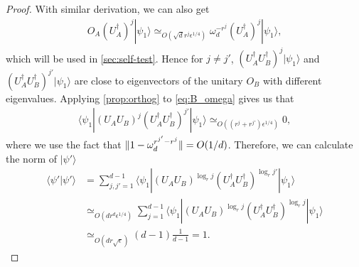 \documentclass[11pt,letterpaper]{article}
\newcommand{\ket}[1]{|#1\rangle}
\newcommand{\bra}[1]{\langle#1|}
\newcommand{\braket}[2]{\langle#1|#2\rangle}
\newcommand{\ct}{^{\dagger}}
\DeclarePairedDelimiter{\norm}{\lVert}{\rVert}
\newcommand{\1}{\mathbb{1}}
\newcommand{\nr}{n(r)}
\newcommand{\se}{\sqrt{\epsilon}}
\newcommand{\qe}{\epsilon^{1/4}}
\newcommand{\sd}{\sqrt{d}}
\newcommand{\sr}{\sqrt{r}}
\newcommand{\appd}[1]{\simeq_{#1}}
\theoremstyle{definition}
\begin{document}
\begin{proof}
    With similar derivation, we can also get
    \begin{align}
    \label{eq:A_omega}
        O_A (U_A\ct)^j \ket{\psi_1} \appd{O(\sd r^{j} \qe)}\omega_d^{-r^j}  (U_A\ct)^j \ket{\psi_1},
    \end{align}
    which will be used in \cref{sec:self-test}.
	Hence for $j \neq j'$, $(U_A\ct U_B\ct)^{j} \ket{\psi_1}$ and $(U_A\ct U_B\ct)^{ j'} \ket{\psi_1}$ are close to eigenvectors
	of the unitary $O_B$ with different eigenvalues.
	Applying \cref{prop:orthog} to \cref{eq:B_omega} gives us that  
	\begin{align*}
		\bra{\psi_1} (U_AU_B)^{j} (U_A\ct U_B\ct)^{ j'} \ket{\psi_1} \appd{O( (r^j + r^{j'}) \qe)} 0,
	\end{align*}
	where we use the fact that $\norm{1 - \omega_d^{r^{j'}-r^j}} = O(1/d)$.
	Therefore, we can calculate the norm of $\ket{\psi'}$ 
	\begin{align*}
		\braket{\psi'}{\psi'} &=\sum_{j,j'=1}^{d-1} \bra{\psi_1} (U_AU_B)^{\log_r j} (U_A\ct U_B\ct)^{\log_r j'} \ket{\psi_1}\\
		&\appd{O(dr^{d} \qe)} \sum_{j=1}^{d-1} \bra{\psi_1} (U_AU_B)^{\log_r j} (U_A\ct U_B\ct)^{\log_r j} \ket{\psi_1}\\
		&\appd{O(dr\se)} (d-1) \frac{1}{d-1} = 1.
	\end{align*}
	

\end{proof}
\end{document}
